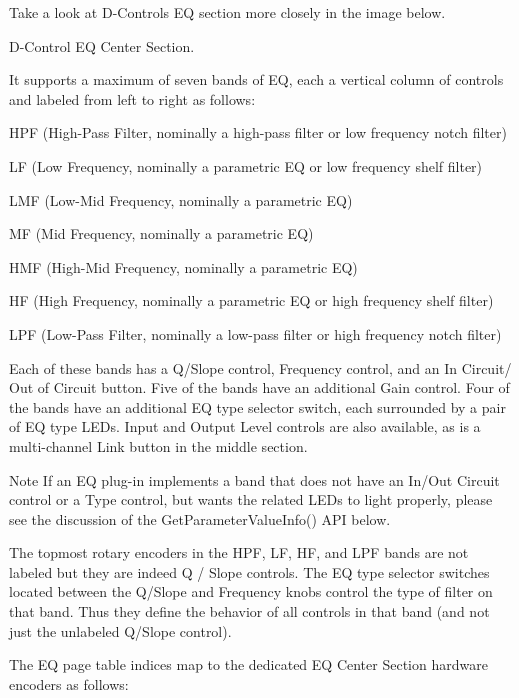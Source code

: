 Take a look at D-\/\+Control\textquotesingle{}s E\+Q section more closely in the image below.

  D-\/\+Control E\+Q Center Section. 

It supports a maximum of seven bands of E\+Q, each a vertical column of controls and labeled from left to right as follows\+: 
\begin{DoxyItemize}
\item H\+P\+F (High-\/\+Pass Filter, nominally a high-\/pass filter or low frequency notch filter)  
\item L\+F (Low Frequency, nominally a parametric E\+Q or low frequency shelf filter)  
\item L\+M\+F (Low-\/\+Mid Frequency, nominally a parametric E\+Q)  
\item M\+F (Mid Frequency, nominally a parametric E\+Q)  
\item H\+M\+F (High-\/\+Mid Frequency, nominally a parametric E\+Q)  
\item H\+F (High Frequency, nominally a parametric E\+Q or high frequency shelf filter)  
\item L\+P\+F (Low-\/\+Pass Filter, nominally a low-\/pass filter or high frequency notch filter)  
\end{DoxyItemize}

Each of these bands has a Q/\+Slope control, Frequency control, and an In Circuit/ Out of Circuit button. Five of the bands have an additional Gain control. Four of the bands have an additional E\+Q type selector switch, each surrounded by a pair of E\+Q type L\+E\+D\textquotesingle{}s. Input and Output Level controls are also available, as is a multi-\/channel Link button in the middle section.

\begin{DoxyNote}{Note}
If an E\+Q plug-\/in implements a band that does not have an In/\+Out Circuit control or a Type control, but wants the related L\+E\+D\textquotesingle{}s to light properly, please see the discussion of the {\ttfamily Get\+Parameter\+Value\+Info()} A\+P\+I below.
\end{DoxyNote}
The topmost rotary encoders in the H\+P\+F, L\+F, H\+F, and L\+P\+F bands are not labeled but they are indeed Q / Slope controls. The E\+Q type selector switches located between the Q/\+Slope and Frequency knobs control the type of filter on that band. Thus they define the behavior of all controls in that band (and not just the unlabeled Q/\+Slope control).

The E\+Q page table indices map to the dedicated E\+Q Center Section hardware encoders as follows\+:


